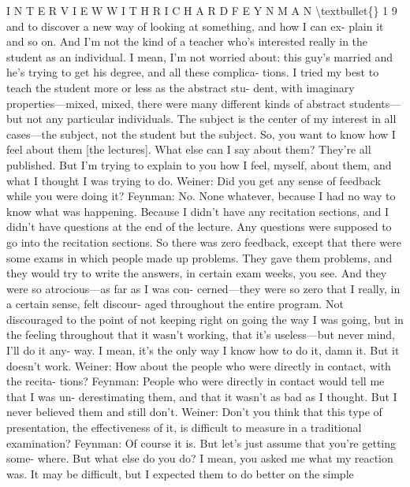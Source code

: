 \documentclass[10pt,oneside]{article}
\begin{document}
I N T E R V I E W  W I T H  R I C H A R D  F E Y N M A N \textbackslash{}textbullet\{\} 1 9 and to discover a new way of looking at something, and how I can ex- plain it and so on. And I’m not the kind of a teacher who’s interested really in the student as an individual. I mean, I’m not worried about: this guy’s married and he’s trying to get his degree, and all these complica- tions. I tried my best to teach the student more or less as the abstract stu- dent, with imaginary properties---mixed, mixed, there were many different kinds of abstract students---but not any particular individuals. The subject is the center of my interest in all cases---the subject, not the student but the subject. So, you want to know how I feel about them [the lectures]. What else can I say about them? They’re all published. But I’m trying to explain to you how I feel, myself, about them, and what I thought I was trying to do. Weiner: Did you get any sense of feedback while you were doing it? Feynman: No. None whatever, because I had no way to know what was happening. Because I didn’t have any recitation sections, and I didn’t have questions at the end of the lecture. Any questions were supposed to go into the recitation sections. So there was zero feedback, except that there were some exams in which people made up problems. They gave them problems, and they would try to write the answers, in certain exam weeks, you see. And they were so atrocious---as far as I was con- cerned---they were so zero that I really, in a certain sense, felt discour- aged throughout the entire program. Not discouraged to the point of not keeping right on going the way I was going, but in the feeling throughout that it wasn’t working, that it’s useless---but never mind, I’ll do it any- way. I mean, it’s the only way I know how to do it, damn it. But it doesn’t work. Weiner: How about the people who were directly in contact, with the recita- tions? Feynman: People who were directly in contact would tell me that I was un- derestimating them, and that it wasn’t as bad as I thought. But I never believed them and still don’t. Weiner: Don’t you think that this type of presentation, the effectiveness of it, is difficult to measure in a traditional examination? Feynman: Of course it is. But let’s just assume that you’re getting some- where. But what else do you do? I mean, you asked me what my reaction was. It may be difficult, but I expected them to do better on the simple\par
\end{document}
